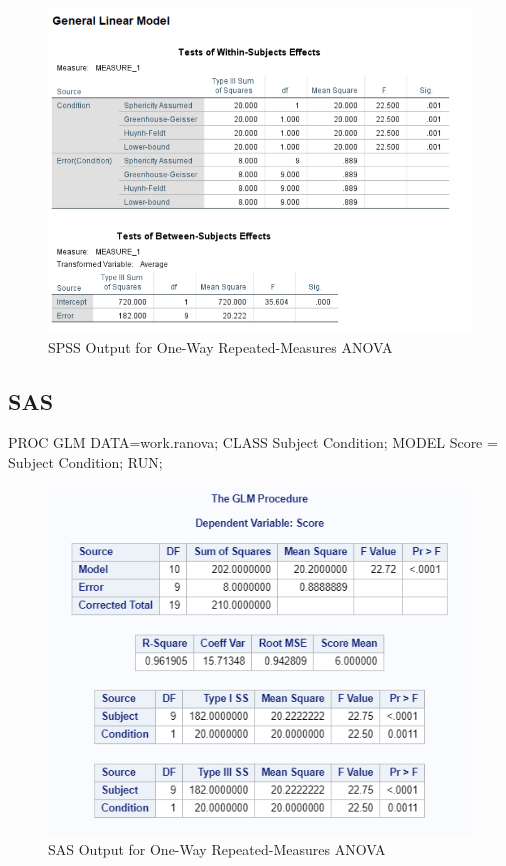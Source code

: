 \documentclass[
]{book}
\newenvironment{Shaded}{\begin{snugshade}}{\end{snugshade}}
\newcommand{\NormalTok}[1]{#1}
\newcommand{\StringTok}[1]{\textcolor[rgb]{0.31,0.60,0.02}{#1}}
\begin{document}
\begin{figure}[!h]
\includegraphics{Screenshots/Repeated Measures ANOVA/ranovaSPSS} \caption{\label{fig:ranovaSPSS}SPSS Output for One-Way Repeated-Measures ANOVA}\label{fig:ranovaSPSS}
\end{figure}

\hypertarget{sas-3}{%
\subsection{SAS}\label{sas-3}}

\begin{Shaded}
\begin{Highlighting}[]
\NormalTok{PROC GLM DATA=work.ranova;}
\NormalTok{  CLASS Subject Condition;}
\NormalTok{  MODEL Score =}\StringTok{ }\NormalTok{Subject Condition;}
\NormalTok{RUN; }
\end{Highlighting}
\end{Shaded}

\begin{figure}[!h]
\includegraphics{Screenshots/Repeated Measures ANOVA/ranovaSAS} \caption{\label{fig:ranovaSAS}SAS Output for One-Way Repeated-Measures ANOVA}\label{fig:ranovaSAS}
\end{figure}
\end{document}
